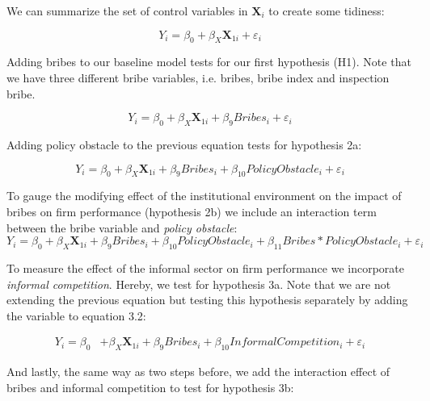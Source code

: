 We can summarize the set of control variables in $\boldsymbol{X}_{i}$ to create some  tidiness:

\begin{equation*}
 Y_{i}=\beta_{0}+\beta_{X}\boldsymbol{X}_{1i}+\varepsilon_{i}  
\end{equation*}

Adding bribes to our baseline model tests for our first hypothesis (H1). Note that we have three different bribe variables, i.e. bribes, bribe index and inspection bribe. 

\begin{equation}\tag{Eq. 1}
 Y_{i}=\beta_{0}+\beta_{X}\boldsymbol{X}_{1i}+\beta_{9}Bribes_{i}+\varepsilon_{i}  
\end{equation}

Adding policy obstacle to the previous equation tests for hypothesis 2a:

\begin{equation}\tag{Eq. 2a}
 Y_{i}=\beta_{0}+\beta_{X}\boldsymbol{X}_{1i}+\beta_{9}Bribes_{i}+\beta_{10}PolicyObstacle_{i}+\varepsilon_{i}  
\end{equation}

To gauge the modifying effect of the institutional environment on the impact of bribes on firm performance (hypothesis 2b) we include an interaction term between the bribe variable and \textit{policy obstacle}:
\begin{equation}\tag{Eq. 2b}
 Y_{i}=\beta_{0}+\beta_{X}\boldsymbol{X}_{1i}+\beta_{9}Bribes_{i}+\beta_{10}PolicyObstacle_{i}+\beta_{11}Bribes*PolicyObstacle_{i}+\varepsilon_{i}  
\end{equation}

To measure the effect of the informal sector on firm performance we incorporate \textit{informal competition}. Hereby, we test for hypothesis 3a. Note that we are not extending the previous equation but testing this hypothesis separately by adding the variable to equation 3.2:

\begin{equation}\tag{Eq. 3a}
\begin{split}
  Y_{i}=\beta_{0}&+\beta_{X}\boldsymbol{X}_{1i}+\beta_{9}Bribes_{i}+\beta_{10}InformalCompetition_{i}+\varepsilon_{i}   
\end{split}
\end{equation}

And lastly, the same way as two steps before, we add the interaction effect of bribes and informal competition to test for hypothesis 3b:

